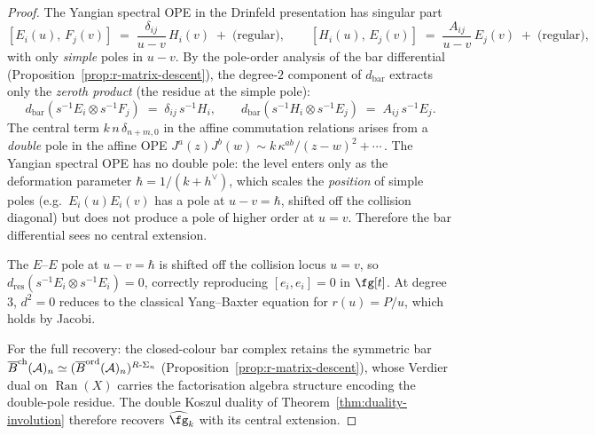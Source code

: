\begin{construction}
\begin{proof}
The Yangian spectral OPE in the Drinfeld presentation has singular part
\[
 [E_i(u),\,F_j(v)]
 \;=\;
 \frac{\delta_{ij}}{u-v}\,H_i(v)
 \;+\;\text{(regular)},
 \qquad
 [H_i(u),\,E_j(v)]
 \;=\;
 \frac{A_{ij}}{u-v}\,E_j(v)
 \;+\;\text{(regular)},
\]
with only \emph{simple} poles in $u-v$. By the pole-order
analysis of the bar differential
(Proposition~\ref{prop:r-matrix-descent}), the degree-$2$
component of $d_{\mathrm{bar}}$ extracts only the
\emph{zeroth product} (the residue at the simple pole):
\[
 d_{\mathrm{bar}}(s^{-1}E_i\otimes s^{-1}F_j)
 \;=\;
 \delta_{ij}\,s^{-1}H_i,
 \qquad
 d_{\mathrm{bar}}(s^{-1}H_i\otimes s^{-1}E_j)
 \;=\;
 A_{ij}\,s^{-1}E_j.
\]
The central term $k\,n\,\delta_{n+m,0}$ in the affine
commutation relations arises from a \emph{double} pole in the
affine OPE $J^a(z)J^b(w)\sim k\,\kappa^{ab}/(z{-}w)^2+\cdots$\,.
The Yangian spectral OPE has no double pole: the level enters
only as the deformation parameter $\hbar=1/(k{+}h^\vee)$,
which scales the \emph{position} of simple poles (e.g.\
$E_i(u)E_i(v)$ has a pole at $u-v=\hbar$, shifted off the
collision diagonal) but does not produce a pole of higher
order at $u=v$. Therefore the bar differential sees no
central extension.

The $E$--$E$ pole at $u-v=\hbar$ is shifted off the collision
locus $u=v$, so
$d_{\mathrm{res}}(s^{-1}E_i\otimes s^{-1}E_i)=0$, correctly
reproducing $[e_i,e_i]=0$ in $\fg[t]$. At degree~$3$,
$d^2=0$ reduces to the classical Yang--Baxter equation for
$r(u)=P/u$, which holds by Jacobi.

For the full recovery: the closed-colour bar complex retains the symmetric bar
$\overline{B}^{\mathrm{ch}}(\mathcal{A})_n\simeq
(\overline{B}^{\mathrm{ord}}(\mathcal{A})_n)^{R\text{-}\Sigma_n}$
(Proposition~\ref{prop:r-matrix-descent}), whose Verdier
dual on $\operatorname{Ran}(X)$ carries the factorisation
algebra structure encoding the double-pole residue. The
double Koszul duality of
Theorem~\ref{thm:duality-involution} therefore recovers
$\widehat{\fg}_k$ with its central extension.
\end{proof}


\end{construction}
